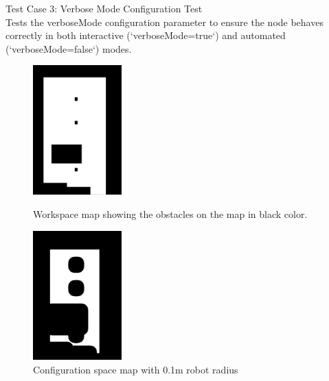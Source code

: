 \documentclass{CSSRforAfrica}
\begin{document}
\noindent Test Case 3: Verbose Mode Configuration Test \\
Tests the verboseMode configuration parameter to ensure the node behaves correctly in both interactive (`verboseMode=true`) and automated (`verboseMode=false`) modes.

\begin{figure}[H]
  \centering
  \begin{minipage}{0.45\textwidth}
    \centering
    \includegraphics[width=\linewidth,height=5cm,keepaspectratio]{images/environmentMap.png}
    \caption{Workspace map showing the obstacles on the map in black color.}
    \label{fig:workspace_map}
  \end{minipage}
  \hfill
  \begin{minipage}{0.45\textwidth}
    \centering
    \includegraphics[width=\linewidth,height=5cm,keepaspectratio]{images/configurationMap0.1.png}
    \caption{Configuration space map with 0.1m robot radius}
    \label{fig:config_space_0.1m}
  \end{minipage}
\end{figure}
\end{document}
